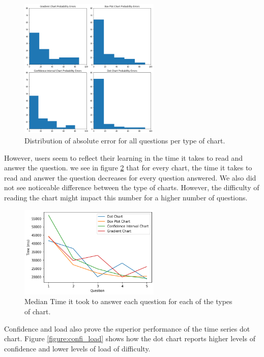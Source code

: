 \documentclass[a4paper,3p,sort&compress]{elsarticle}
\begin{document}
\begin{figure}
  \centering
  \includegraphics[width=0.6\textwidth]{probability_errors}
  \caption{\label{figure:errors}Distribution of absolute error for all questions per type of chart.}
\end{figure}

However, users seem to reflect their learning in the time it takes to read 
and answer the question. we see in figure \ref{figure:duration} that for every chart, the time it takes 
to read and answer the question decreases for every question answered. We also did not see 
noticeable difference between the type of charts. However, the difficulty of reading the chart might impact 
this number for a higher number of questions.

\begin{figure}
  \centering
   \includegraphics[width=0.6\textwidth]{duration_evo}
  \caption{\label{figure:duration} Median Time it took to answer each question for each of the types of chart.}
\end{figure}  

Confidence and load also prove the superior performance of the time series dot chart. 
Figure \ref{figure:confi_load} shows how the dot chart reports higher levels of confidence and 
lower levels of load of difficulty.
\end{document}
